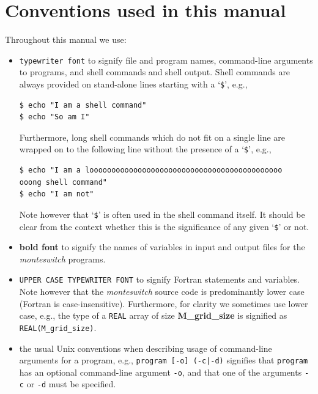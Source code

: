 \documentclass{report}
\begin{document}
\chapter*{Conventions used in this manual}
Throughout this manual we use:
\begin{itemize}
\item \texttt{typewriter font} to signify file and program names, command-line arguments to programs, and shell
commands and shell output. Shell commands are always provided on stand-alone lines starting with a `\verb|$|', e.g.,
\begin{verbatim}
$ echo "I am a shell command"
$ echo "So am I"
\end{verbatim}
Furthermore, long shell commands which do not fit on a single line are wrapped on to the following line without the presence of
a `\verb|$|', e.g.,
\begin{verbatim}
$ echo "I am a loooooooooooooooooooooooooooooooooooooooooooo
ooong shell command"
$ echo "I am not"
\end{verbatim}
Note however that `\verb|$|' is often used in the shell command itself. It should be clear from the context whether this is the
significance of any given `\verb|$|' or not.
\item \textbf{bold font} to signify the names of variables in input and output files for the \emph{monteswitch} programs.
\item \texttt{UPPER CASE TYPEWRITER FONT} to signify Fortran statements and variables. Note however that the \emph{monteswitch} 
source code is predominantly lower case (Fortran is case-insensitive). Furthermore, for clarity we sometimes use lower case, e.g.,
the type of a \texttt{REAL} array of size \textbf{M\_grid\_size} is signified as \texttt{REAL(M\_grid\_size)}.
\item the usual Unix conventions when describing usage of command-line arguments for a program, e.g., 
\texttt{program [-o] (-c|-d)} signifies that \texttt{program} has an optional command-line argument 
\texttt{-o}, and that one of the arguments \texttt{-c} or \texttt{-d} must be specified.
\end{itemize}


\tableofcontents


\end{document}

